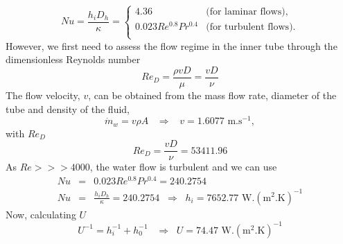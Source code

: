 \documentclass[calculator,datasheet,handbook,solutions]{exam}
\begin{document}
\begin{question}
\begin{enumerate}
{         \begin{displaymath}
                Nu = \frac{h_{i}D_{h}}{\kappa} =
                     \begin{cases}
                         4.36  & \text{(for laminar flows),} \\
                         0.023 Re^{0.8} Pr^{0.4} & \text{(for turbulent flows).} \\
                     \end{cases}
         \end{displaymath}
         However, we first need to assess the flow regime in the inner tube through the dimensionless Reynolds number
         \begin{displaymath}
           Re_{D} = \frac{\rho v D}{\mu} = \frac{v D}{\nu}
         \end{displaymath}
         The flow velocity, $v$, can be obtained from the mass flow rate, diameter of the tube and density of the fluid,~
         \begin{displaymath}
           \dot{m}_{w} = v\rho A \;\;\;\Longrightarrow\;\;\; v = 1.6077\text{ m.s}^{-1},
         \end{displaymath}
         with $Re_{D}$~
         \begin{displaymath}
           Re_{D} = \frac{v D}{\nu} = 53411.96
         \end{displaymath}
         As $Re >>> 4000$, the water flow is turbulent and we can use~ 
         \begin{eqnarray}
           Nu &=& 0.023 Re^{0.8} Pr^{0.4} = 240.2754 \nonumber \\
           Nu &=& \frac{h_{i}D_{h}}{\kappa} = 240.2754 \;\;\Longrightarrow \;\; h_{i} = 7652.77 \text{ W.}\left(\text{m}^{2}.\text{K}\right)^{-1} \nonumber
         \end{eqnarray}
         Now, calculating $U$~ 
           \begin{displaymath}
             U^{-1} = h_{i}^{-1} + h_{0}^{-1} \;\;\;\Longrightarrow\;\; U =74.47 \text{ W.}\left(\text{m}^{2}.\text{K}\right)^{-1}
           \end{displaymath}
            
         }
         

\end{enumerate}
\end{question}
\end{document}
